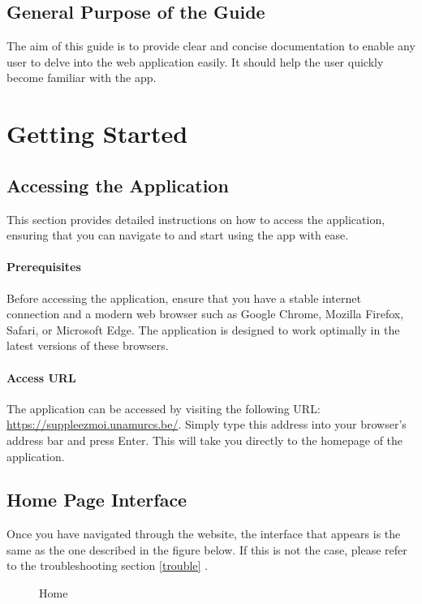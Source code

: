 \documentclass[12pt]{article}
\begin{document}
\subsection{General Purpose of the Guide}
The aim of this guide is to provide clear and concise documentation to enable any user to delve into the web application easily. It should help the user quickly become familiar with the app.



\section{Getting Started}

\subsection{Accessing the Application}
This section provides detailed instructions on how to access the application, ensuring that you can navigate to and start using the app with ease.

\paragraph{Prerequisites}
Before accessing the application, ensure that you have a stable internet connection and a modern web browser such as Google Chrome, Mozilla Firefox, Safari, or Microsoft Edge. The application is designed to work optimally in the latest versions of these browsers.

\paragraph{Access URL}
The application can be accessed by visiting the following URL: \textcolor{blue}{\url{https://suppleezmoi.unamurcs.be/}}. Simply type this address into your browser's address bar and press Enter. This will take you directly to the homepage of the application.


\subsection{Home Page Interface}
Once you have navigated through the website, the interface that appears is the same as the one described in the figure below. If this is not the case, please refer to the troubleshooting section \textcolor{blue}{\ref{trouble}} .
\begin{figure}[H]
    \centering
\label{fig:im1}
    \caption{Home}
\end{figure}
\end{document}
